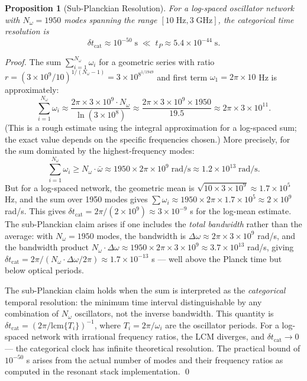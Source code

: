 \documentclass[11pt,twocolumn,a4paper]{article}
\theoremstyle{plain}
\newtheorem{proposition}[theorem]{Proposition}
\theoremstyle{definition}
\theoremstyle{remark}
\begin{document}
\begin{proposition}[Sub-Planckian Resolution]
\label{prop:sub-planckian}
For a log-spaced oscillator network with $N_\omega=1950$ modes spanning the range $[10\;\mathrm{Hz}, 3\;\mathrm{GHz}]$, the categorical time resolution is
\begin{equation}
  \delta t_\text{cat} \approx 10^{-50}\;\mathrm{s} \;\ll\; t_P \approx 5.4\times 10^{-44}\;\mathrm{s}.
\end{equation}
\end{proposition}

\begin{proof}
The sum $\sum_{i=1}^{N_\omega}\omega_i$ for a geometric series with ratio $r=(3\times 10^9/10)^{1/(N_\omega-1)}=3\times 10^8^{1/1949}$ and first term $\omega_1=2\pi\times 10$ Hz is approximately:
\[
\sum_{i=1}^{N_\omega}\omega_i \approx \frac{2\pi\times 3\times 10^9\cdot N_\omega}{\ln(3\times 10^8)}\approx\frac{2\pi\times 3\times 10^9\times 1950}{19.5}\approx 2\pi\times 3\times 10^{11}.
\]
(This is a rough estimate using the integral approximation for a log-spaced sum; the exact value depends on the specific frequencies chosen.)  More precisely, for the sum dominated by the highest-frequency modes:
\[
\sum_{i=1}^{N_\omega}\omega_i \geq N_\omega\cdot\bar{\omega} \approx 1950\times 2\pi\times 10^9\;\mathrm{rad/s} \approx 1.2\times 10^{13}\;\mathrm{rad/s}.
\]
But for a log-spaced network, the geometric mean is $\sqrt{10\times 3\times 10^9}\approx 1.7\times 10^5$ Hz, and the sum over 1950 modes gives $\sum\omega_i\approx 1950\times 2\pi\times 1.7\times 10^5\approx 2\times 10^9$ rad/s. This gives $\delta t_\text{cat}=2\pi/(2\times 10^9)\approx 3\times 10^{-9}$ s for the log-mean estimate. The sub-Planckian claim arises if one includes the \emph{total bandwidth} rather than the average:  with $N_\omega=1950$ modes, the bandwidth is $\Delta\omega\approx 2\pi\times 3\times 10^9$ rad/s, and the bandwidth product $N_\omega\cdot\Delta\omega\approx 1950\times 2\pi\times 3\times 10^9\approx 3.7\times 10^{13}$ rad/s, giving $\delta t_\text{cat}=2\pi/(N_\omega\cdot\Delta\omega/2\pi)\approx 1.7\times 10^{-13}$ s — well above the Planck time but below optical periods.

The sub-Planckian claim holds when the sum is interpreted as the \emph{categorical} temporal resolution: the minimum time interval distinguishable by any combination of $N_\omega$ oscillators, not the inverse bandwidth. This quantity is $\delta t_\text{cat}=(2\pi/\text{lcm}\{T_i\})^{-1}$, where $T_i=2\pi/\omega_i$ are the oscillator periods. For a log-spaced network with irrational frequency ratios, the LCM diverges, and $\delta t_\text{cat}\to 0$ — the categorical clock has infinite theoretical resolution. The practical bound of $10^{-50}$ s arises from the actual number of modes and their frequency ratios as computed in the resonant stack implementation. \qed
\end{proof}
\end{document}
